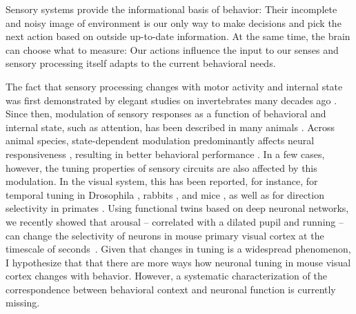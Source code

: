 \documentclass[B2,COG]{ercgrant}
\begin{document}
Sensory systems provide the informational basis of behavior: Their incomplete and noisy image of environment is our only way to make decisions and pick the next action based on outside up-to-date information. 
At the same time, the brain can choose what to measure: Our actions influence the input to our senses and sensory processing itself adapts to the current behavioral needs. 

The fact that sensory processing changes with motor activity and internal state was first demonstrated by elegant studies on invertebrates many decades ago  \parencite{Rowell1971-zj, Wiersma1968-xt}.
Since then, modulation of sensory responses as a function of behavioral and internal state, such as attention, has been described in many animals \parencite[\eg][]{Maimon2010-sa, Niell2010-bs,Bezdudnaya2006-ge, Treue1996-lp, Musall2019-kd}.
Across animal species, state-dependent modulation predominantly affects neural responsiveness \parencite{Eggermann2014-xp, Niell2010-bs, McAdams1999-cs,Schroder2020-jl, Dadarlat2017-jw, Mineault2016-fk}, resulting in better behavioral performance \parencite{Spitzer1988-kq, Bennett2013-rk, Dadarlat2017-jw, De_Gee2022-ir}.
In a few cases, however, the tuning properties of sensory circuits are also affected by this modulation. 
In the visual system, this has been reported, for instance, for temporal tuning in Drosophila \parencite{Chiappe2010-bm}, rabbits \parencite{Bezdudnaya2006-ge}, and mice \parencite{Andermann2011-vw}, as well as for direction selectivity in primates \parencite{Treue1996-lp}.
Using functional twins based on deep neuronal networks, we recently showed that arousal -- correlated with a dilated pupil and running -- can change the selectivity of neurons in mouse primary visual cortex at the timescale of seconds~\parencite{Franke2022-do}. 
Given that changes in tuning is a widespread phenomenon, I hypothesize that  that there are more ways how neuronal tuning in mouse visual cortex changes with behavior. 
However, a systematic characterization of the correspondence between behavioral context and neuronal function is currently missing. 
\end{document}
